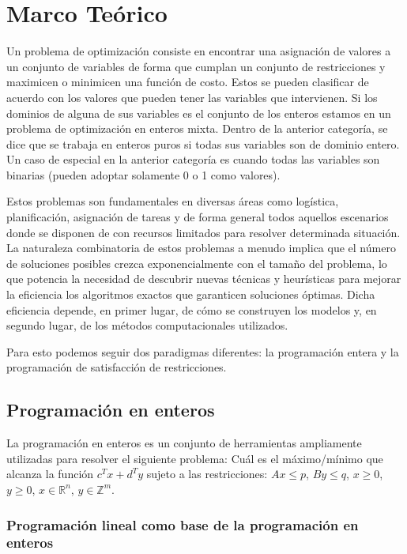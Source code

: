 \documentclass[runningheads]{llncs}
\begin{document}
\section{Marco Teórico}

Un problema de optimización consiste en encontrar una asignación de valores a un conjunto de variables de forma que cumplan un conjunto de restricciones y maximicen o minimicen una función de costo. Estos se pueden clasificar de acuerdo con los valores que pueden tener las variables que intervienen. Si los dominios de alguna de sus variables es el conjunto de los enteros estamos en un problema de optimización en enteros mixta. Dentro de la anterior categoría, se dice que se trabaja en enteros puros si todas sus variables son de dominio entero. Un caso de especial en la anterior categoría es cuando todas las variables son binarias (pueden adoptar solamente 0 o 1 como valores).

Estos problemas son fundamentales en diversas áreas como logística, planificación, asignación de tareas y de forma general todos aquellos escenarios donde se disponen de con recursos limitados para resolver determinada situación. La naturaleza combinatoria de estos problemas a menudo implica que el número de soluciones posibles crezca exponencialmente con el tamaño del problema, lo que potencia la necesidad de descubrir nuevas técnicas y heurísticas para mejorar la eficiencia los algoritmos exactos que garanticen soluciones óptimas. Dicha eficiencia depende, en primer lugar, de cómo se construyen los modelos y, en segundo lugar, de los métodos computacionales utilizados. 

Para esto podemos seguir dos paradigmas diferentes: la programación entera y la programación de satisfacción de restricciones.

\subsection{Programación en enteros}

La programación en enteros es un conjunto de herramientas ampliamente utilizadas para resolver el siguiente problema: Cuál es el máximo/mínimo que alcanza la función $c^Tx+d^Ty$ sujeto a las restricciones: $Ax\leq p$, $By\leq q$, $x\geq 0$, $y\geq 0$, $x\in \mathbb{R} ^n$, $y\in \mathbb{Z}^m$.  


\subsubsection{Programación lineal como base de la programación en enteros\\}
\end{document}

